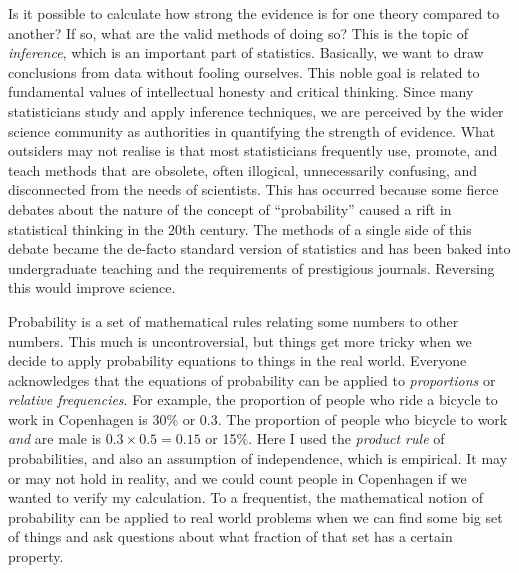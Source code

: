 \documentclass[a4paper, 12pt]{article}
\begin{document}

Is it possible to calculate how strong the evidence is for one theory compared
to another? If so, what are the valid methods of doing so? This is the topic
of {\em inference}, which is an important part of statistics.
Basically, we want to
draw conclusions from data without fooling ourselves. This noble goal
is related to fundamental values of intellectual honesty and critical
thinking.
Since many statisticians study and apply inference techniques,
we are perceived by the wider science community as authorities
in quantifying the strength of evidence. What outsiders may not realise is
that most statisticians frequently use, promote, and teach methods that are
obsolete, often illogical, unnecessarily confusing, and disconnected from the
needs of scientists. This has occurred because some fierce debates about the
nature of the concept of ``probability'' caused a rift in statistical thinking
in the 20th century. The methods of a single side of this debate became the
de-facto standard version of statistics and has been baked into undergraduate
teaching and the requirements of prestigious journals. Reversing this would
improve science.


Probability is a set of mathematical rules relating some
numbers to other numbers. This much is uncontroversial, but things get more
tricky when we decide to apply probability equations to things in the real
world. Everyone acknowledges that the equations of probability can be applied
to {\em proportions} or {\em relative frequencies}. For example, the proportion
of people who ride a bicycle to work in Copenhagen is 30\% or 0.3.
The proportion of people who bicycle to work {\em and} are male is
$0.3 \times 0.5 = 0.15$ or 15$\%$. Here I used the {\em product rule} of
probabilities, and also an assumption of independence, which is empirical.
It may or may not hold in reality, and we could count people in Copenhagen if
we wanted to verify my calculation. To a frequentist, the mathematical notion
of probability can be applied to real world problems when we can find some
big set of things and ask questions about what fraction of that set has a
certain property.
\end{document}
